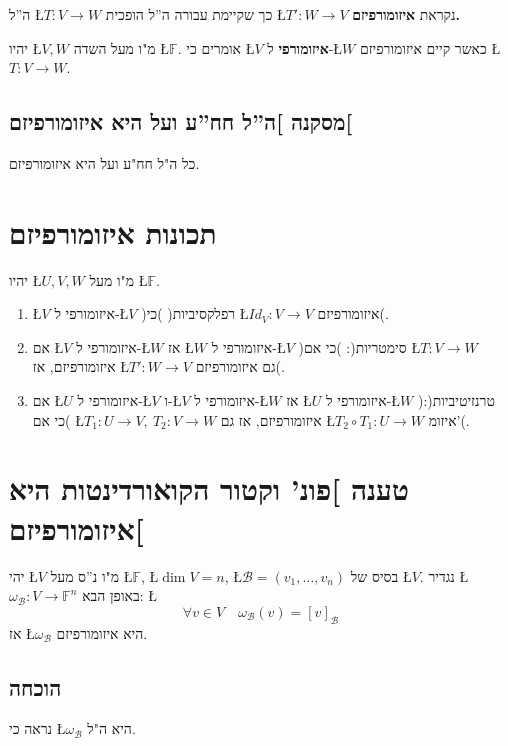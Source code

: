 \documentclass[english,hebrew]{article}
\begin{document}
ה\textquotedblright ל \L{$T:V\rightarrow W$} כך שקיימת עבורה ה\textquotedblright ל
הופכית \L{$T':W\rightarrow V$} נקראת \textbf{איזומורפיזם.}

יהיו \L{$V,W$} מ"ו מעל השדה \L{$\mathbb{F}$}. אומרים כי \L{$V$}
\textbf{איזומורפי} ל-\L{$W$} כאשר קיים איזומורפיזם \L{$T:V\to W$}.

\subsection{מסקנה {]}ה\textquotedblright ל חח\textquotedblright ע ועל היא איזומורפיזם{[}}

כל ה"ל חח"ע ועל היא איזומורפיזם.

\section{תכונות איזומורפיזם}

יהיו \L{$U,V,W$} מ"ו מעל \L{$\mathbb{F}$}. 
\begin{enumerate}
\item \L{$V$} איזומורפי ל-\L{$V$} )רפלקסיביות( )כי \L{$Id_{V}:V\to V$}
איזומורפיזם(. 
\item אם \L{$V$} איזומורפי ל-\L{$W$} אז \L{$W$} איזומורפי ל-\L{$V$}
)סימטריות(: )כי אם \L{$T:V\to W$} איזומורפיזם, אז \L{$T':W\to V$}
גם איזומורפיזם(. 
\item אם \L{$U$} איזומורפי ל-\L{$V$} ו-\L{$V$} איזומורפי ל-\L{$W$} אז
\L{$U$} איזומורפי ל-\L{$W$} )טרנזיטיביות(: )כי אם \L{$T_{1}:U\rightarrow V,\ T_{2}:V\rightarrow W$}
איזומורפיזם, אז גם \L{$T_{2}\circ T_{1}:U\rightarrow W$} איזומ'(.
\end{enumerate}

\section{טענה {]}פונ' וקטור הקואורדינטות היא איזומורפיזם{[}}

יהי \L{$V$} מ"ו נ\textquotedblright ס מעל \L{$\mathbb{F}$}, \L{$\dim V=n$},
\L{$\mathcal{B}=(v_{1},\dots,v_{n})$} בסיס של \L{$V$}. נגדיר \L{$\omega_{\mathcal{B}}:V\to\mathbb{F}^{n}$}
באופן הבא: \L{%
\[
\forall v\in V\quad\omega_{\mathcal{B}}(v)=[v]_{\mathcal{B}}
\]
}%
אז \L{$\omega_{\mathcal{B}}$} היא איזומורפיזם.

\subsection{הוכחה}

נראה כי \L{$\omega_{\mathcal{B}}$} היא ה"ל.
\end{document}
